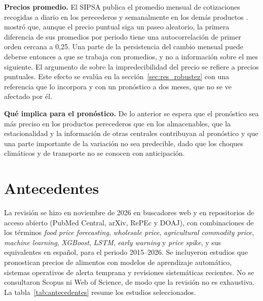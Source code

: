 \textbf{Precios promedio.} El SIPSA publica el promedio mensual de cotizaciones recogidas a diario en los perecederos y semanalmente en los demás productos \citep{danefme2022}. \citet{working1960} mostró que, aunque el precio puntual siga un paseo aleatorio, la primera diferencia de sus promedios por periodo tiene una autocorrelación de primer orden cercana a 0,25. Una parte de la persistencia del cambio mensual puede deberse entonces a que se trabaja con promedios, y no a información sobre el mes siguiente. El argumento de \citet{samuelson1965} sobre la impredecibilidad del precio se refiere a precios puntuales. Este efecto se evalúa en la sección~\ref{sec:res_robustez} con una referencia que lo incorpora y con un pronóstico a dos meses, que no se ve afectado por él.

\textbf{Qué implica para el pronóstico.} De lo anterior se espera que el pronóstico sea más preciso en los productos perecederos que en los almacenables, que la estacionalidad y la información de otras centrales contribuyan al pronóstico y que una parte importante de la variación no sea predecible, dado que los choques climáticos y de transporte no se conocen con anticipación.

\section{Antecedentes}
\label{sec:antecedentes}

La revisión se hizo en noviembre de 2026 en buscadores web y en repositorios de acceso abierto (PubMed Central, arXiv, RePEc y DOAJ), con combinaciones de los términos \emph{food price forecasting}, \emph{wholesale price}, \emph{agricultural commodity price}, \emph{machine learning}, \emph{XGBoost}, \emph{LSTM}, \emph{early warning} y \emph{price spike}, y sus equivalentes en español, para el periodo 2015--2026. Se incluyeron estudios que pronostican precios de alimentos con modelos de aprendizaje automático, sistemas operativos de alerta temprana y revisiones sistemáticas recientes. No se consultaron Scopus ni Web of Science, de modo que la revisión no es exhaustiva. La tabla~\ref{tab:antecedentes} resume los estudios seleccionados.


